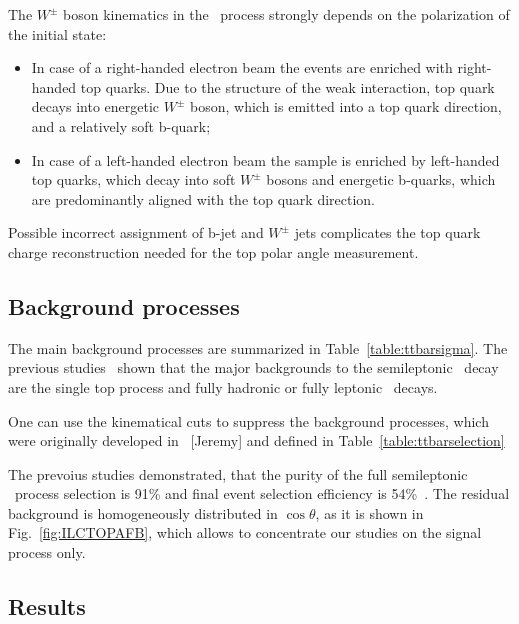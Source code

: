 The $W^\pm$ boson kinematics in the \ttbar\ process strongly depends on the polarization of the initial state:
\begin{itemize}
	\item In case of a right-handed electron beam the events are enriched with right-handed top quarks. Due to the structure of the weak interaction, top quark decays into energetic $W^\pm$ boson, which is emitted into a top quark direction, and a relatively soft b-quark;
	\item In case of a left-handed electron beam the sample is enriched by left-handed top quarks, which decay into soft $W^\pm$ bosons and energetic b-quarks, which are predominantly aligned with the top quark direction. 
\end{itemize}
Possible incorrect assignment of b-jet and $W^\pm$ jets complicates the top quark charge reconstruction needed for the top polar angle measurement. 

\subsection{Background processes}
The main background processes are summarized in Table~\ref{table:ttbarsigma}. 
The previous studies~\cite{bib:ILCTOP}\cite{bib:Doublet} shown that the major backgrounds to the semileptonic \ttbar\ decay are the single top process and fully hadronic or fully leptonic \ttbar\ decays. 


One can use the kinematical cuts to suppress the background processes, which were originally developed in ~\cite{bib:Doublet}[Jeremy] and defined in Table~\ref{table:ttbarselection}

The prevoius studies demonstrated, that the purity of the full semileptonic \ttbar\ process selection is 91\% and final event selection efficiency is 54\%~\cite{bib:ILCTOP}.
The residual background is homogeneously distributed in $\cos\theta$, as it is shown in Fig.~\ref{fig:ILCTOPAFB}, which allows to concentrate our studies on the signal process only. 

\subsection{Results}

